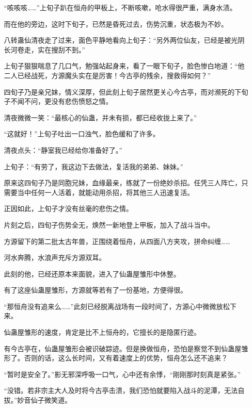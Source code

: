 
\begin{this_body}



“咳咳咳……”上旬子趴在恒舟的甲板上，不断咳嗽，呛水得很严重，满身水渍。

而在他的旁边，这时下旬子，已然是昏死过去，伤势沉重，状态极为不妙。

八转蛊仙清夜走了过来，面色平静地看向上旬子：“另外两位仙友，已经是被光阴长河卷走，实在搜刮不到。”

上旬子狠狠喘息了几口气，勉强站起身来，看了一眼下旬子，脸色惨白地道：“他二人已经战死，方源魔头实在是厉害！今古亭的残余，搜救得如何？”

四旬子乃是亲兄妹，情义深厚，但此刻上旬子居然更关心今古亭，而对濒死的下旬子不闻不问，更没有悲伤愤怒之情。

清夜微微一笑：“最核心的仙蛊，并未有损，都已经收拢上来了。”

“这就好！”上旬子吐出一口浊气，脸色缓和了许多。

清夜点头：“静室我已经给你准备好了。”

上旬子：“有劳了，我这边下去做法，复活我的弟弟、妹妹。”

原来这四旬子乃是同胞兄妹，血缘最亲，练就了一份绝妙杀招。任凭三人阵亡，只需要当中任何一人活着，就能动用杀招，将其他三人迅速复活。

正因如此，上旬子才没有丝毫的悲伤之情。

片刻之后，四旬子伤势全无，焕然一新地登上甲板，加入了战斗当中。

方源留下的第二批太古年兽，正围绕着恒舟，从四面八方夹攻，拼命纠缠……

河水奔腾，水浪声充斥方源双耳。

此刻的他，已经还原本来面貌，进入了仙蛊屋雏形中休整。

有了这座仙蛊屋雏形，方源就等若有了一份基地，方便得很。

“那恒舟没有追来么……”此刻已经脱离战场有一段时间了，方源心中微微放松下来。

仙蛊屋雏形的速度，肯定是比不上恒舟的，它擅长的是隐匿行迹。

有今古亭在，仙蛊屋雏形会被识破踪迹。但是换做恒舟，恐怕是察觉不到仙蛊屋雏形了。否则的话，这么长时间，又有着速度上的优势，恒舟怎么还不追来？

“暂时是安全了。”影无邪深呼吸一口气，心中还有余悸，“刚刚那时刻真是紧张。”

“没错。若非宗主大人及时将今古亭击溃，我们恐怕就要陷入战斗的泥潭，无法自拔。”妙音仙子微笑道。


\end{this_body}
